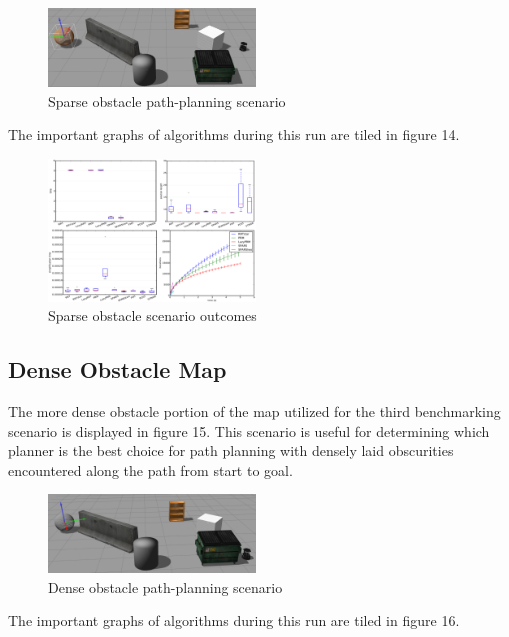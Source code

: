 \documentclass[conference]{IEEEtran} \usepackage[T1]{fontenc} \usepackage[backend=biber, style=ieee]{biblatex}
\begin{document}
\begin{figure}
\label{figure13} 
\centering 
\includegraphics[width=0.49\textwidth]{scenario_2}
\caption{Sparse obstacle path-planning scenario}
\end{figure}

The important graphs of algorithms during this run are tiled in figure 14. 

\begin{figure}
\label{figure14} 
\centering 
\includegraphics[width=0.49\textwidth]{s2_outcomes}
\caption{Sparse obstacle scenario outcomes}
\end{figure}

\subsection{Dense Obstacle Map} \label{Dense Obstacle Map}

The more dense obstacle portion of the map utilized for the third benchmarking scenario is displayed in figure 15. This scenario is useful for determining which planner is 
the best choice for path planning with densely laid obscurities encountered along the path from start to goal.

\begin{figure}
\label{figure15} 
\centering 
\includegraphics[width=0.49\textwidth]{scenario_3}
\caption{Dense obstacle path-planning scenario}
\end{figure}

The important graphs of algorithms during this run are tiled in figure 16. 
\end{document}
